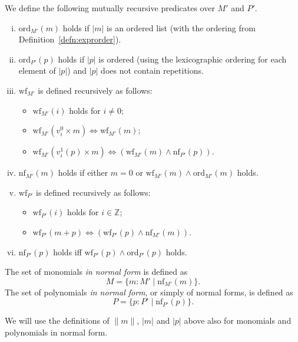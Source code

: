 \documentclass[numreferences]{kluwer}
\newcommand{\alt}{\mathrel{|}}
\newcommand{\Z}{{\mathbb Z}}
\newcommand{\ord}{\ensuremath{\mathrm{ord}}}
\newcommand{\wf}{\ensuremath{\mathrm{wf}}}
\newcommand{\nf}{\ensuremath{\mathrm{nf}}}
\begin{document}
\begin{article}
\begin{definition}\label{def:prenftonf}
We define the following mutually recursive predicates over $M'$ and $P'$.
\begin{enumerate}[(i)]
\item $\ord_{M'}(m)$ holds if $|m|$ is an ordered list (with the ordering
from Definition~\ref{defn:exprorder}).
\item $\ord_{P'}(p)$ holds if $|p|$ is ordered (using the
lexicographic ordering for each element of $|p|$) and $|p|$ does not
contain repetitions.
\item $\wf_{M'}$ is defined recursively as follows:
\begin{itemize}
\item $\wf_{M'}(i)$ holds for $i\neq 0$;
\item $\wf_{M'}(v^0_i\times m)\iff\wf_{M'}(m)$;
\item $\wf_{M'}(v^1_i(p)\times m)\iff(\wf_{M'}(m)\wedge\nf_{P'}(p))$.
\end{itemize}
\item $\nf_{M'}(m)$ holds if either $m=0$ or $\wf_{M'}(m)\wedge\ord_{M'}(m)$
holds.
\item $\wf_{P'}$ is defined recursively as follows:
\begin{itemize}
\item $\wf_{P'}(i)$ holds for $i\in\Z$;
\item $\wf_{P'}(m+p)\iff(\wf_{P'}(p)\wedge\nf_{M'}(m))$.
\end{itemize}
\item $\nf_{P'}(p)$ holds iff $\wf_{P'}(p)\wedge\ord_{P'}(p)$ holds.
\end{enumerate}
\end{definition}

\begin{definition}\label{defn:nf}
The set of monomials \emph{in normal form} is defined as
\[M = \{m:M' \alt \nf_{M'}(m)\}.\]
The set of polynomials \emph{in normal form}, or simply of normal forms,
is defined as \[P = \{p:P' \alt \nf_{P'}(p)\}.\]
\end{definition}

We will use the definitions of $\|m\|$, $|m|$ and $|p|$ above also for
monomials and polynomials in normal form.


\end{article}
\end{document}
